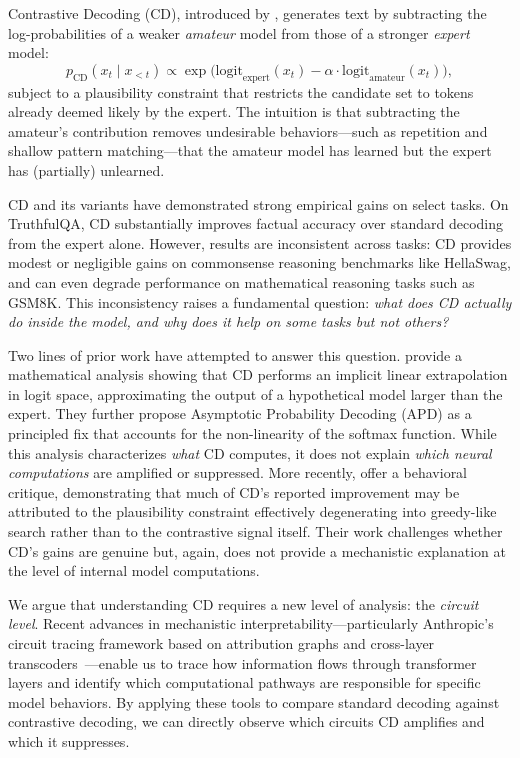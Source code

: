 \documentclass[11pt]{article}
\begin{document}
Contrastive Decoding (CD), introduced by \citet{li2023contrastive}, generates text by subtracting the log-probabilities of a weaker \emph{amateur} model from those of a stronger \emph{expert} model:
\begin{equation}
\label{eq:cd-intro}
p_{\text{CD}}(x_t \mid x_{<t}) \propto \exp\!\bigl(\mathrm{logit}_{\text{expert}}(x_t) - \alpha \cdot \mathrm{logit}_{\text{amateur}}(x_t)\bigr),
\end{equation}
subject to a plausibility constraint that restricts the candidate set to tokens already deemed likely by the expert. The intuition is that subtracting the amateur's contribution removes undesirable behaviors---such as repetition and shallow pattern matching---that the amateur model has learned but the expert has (partially) unlearned.

CD and its variants have demonstrated strong empirical gains on select tasks. On TruthfulQA, CD substantially improves factual accuracy over standard decoding from the expert alone. However, results are inconsistent across tasks: CD provides modest or negligible gains on commonsense reasoning benchmarks like HellaSwag, and can even degrade performance on mathematical reasoning tasks such as GSM8K. This inconsistency raises a fundamental question: \emph{what does CD actually do inside the model, and why does it help on some tasks but not others?}

Two lines of prior work have attempted to answer this question. \citet{chang2024explaining} provide a mathematical analysis showing that CD performs an implicit linear extrapolation in logit space, approximating the output of a hypothetical model larger than the expert. They further propose Asymptotic Probability Decoding (APD) as a principled fix that accounts for the non-linearity of the softmax function. While this analysis characterizes \emph{what} CD computes, it does not explain \emph{which neural computations} are amplified or suppressed. More recently, \citet{yin2025mirage} offer a behavioral critique, demonstrating that much of CD's reported improvement may be attributed to the plausibility constraint effectively degenerating into greedy-like search rather than to the contrastive signal itself. Their work challenges whether CD's gains are genuine but, again, does not provide a mechanistic explanation at the level of internal model computations.

We argue that understanding CD requires a new level of analysis: the \emph{circuit level}. Recent advances in mechanistic interpretability---particularly Anthropic's circuit tracing framework based on attribution graphs and cross-layer transcoders~\citep{anthropic2025attribution}---enable us to trace how information flows through transformer layers and identify which computational pathways are responsible for specific model behaviors. By applying these tools to compare standard decoding against contrastive decoding, we can directly observe which circuits CD amplifies and which it suppresses.
\end{document}
